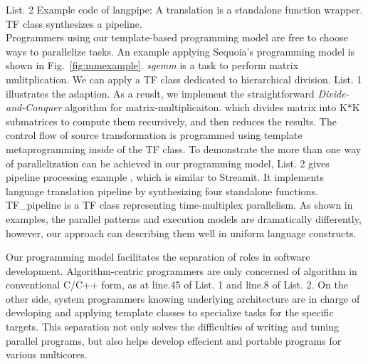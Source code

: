 List. 2  Example code of langpipe: A translation is a standalone
function wrapper. TF class synthesizes a pipeline. \\

Programmers using our template-based programming model are free to
choose ways to parallelize tasks. An example applying 
Sequoia's programming model is shown in Fig.~\ref{fig:mmexample}. 
\textit{sgemm} is a task to perform matrix mulitplication. 
We can apply a TF class dedicated to hierarchical division.  List. 1
illustrates the adaption. As a reuslt, we
implement the straightforward \emph{Divide-and-Conquer} algorithm for matrix-multiplicaiton. which divides matrix into K*K
submatrices to compute them recursively, and then reduces the results.
The control flow of source transformation is programmed
using template metaprogramming inside of the TF class. 
To demonstrate the more than one way of parallelization can be
achieved in our programming model, List. 2 gives pipeline processing example
, which is similar to Streamit. It implements language translation pipeline by
synthesizing four standalone functions. TF\_pipeline is a TF class
representing time-multiplex parallelism. As shown in examples,
the parallel patterns and execution models are dramatically
differently, however, our approach can describing them well in uniform
language constructs.

Our programming model facilitates the separation of roles in software
development. Algorithm-centric programmers are only concerned of algorithm
in conventional C/C++ form, as at line.45 of List. 1 and line.8 of
List. 2. On the other side,  system programmers knowing underlying
architecture are in charge of developing and
applying template classes to specialize tasks for the specific
targets. This separation not only solves the difficulties of writing and
tuning parallel programs, but also helps develop effecient and
portable programs for various multicores.


